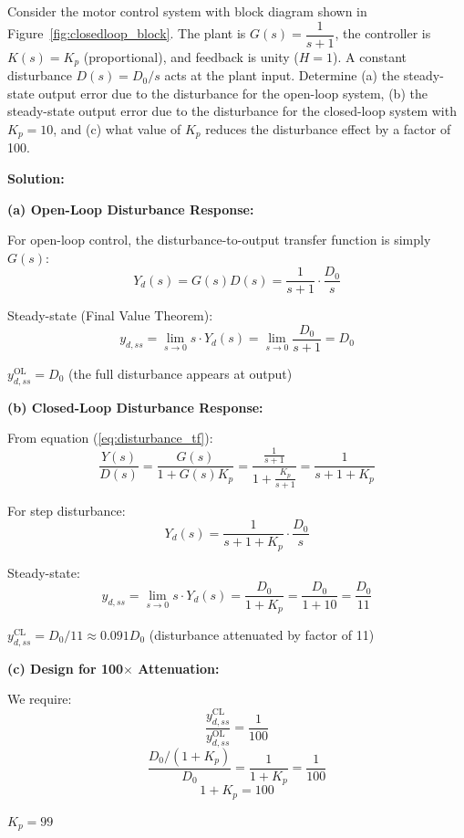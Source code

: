 \begin{example}
\label{ex:disturbance}
Consider the motor control system with block diagram shown in Figure~\ref{fig:closedloop_block}. The plant is $G(s) = \dfrac{1}{s+1}$, the controller is $K(s) = K_p$ (proportional), and feedback is unity ($H = 1$). A constant disturbance $D(s) = D_0/s$ acts at the plant input. Determine (a) the steady-state output error due to the disturbance for the open-loop system, (b) the steady-state output error due to the disturbance for the closed-loop system with $K_p = 10$, and (c) what value of $K_p$ reduces the disturbance effect by a factor of 100.

\textbf{Solution:}

\textbf{(a) Open-Loop Disturbance Response:}

For open-loop control, the disturbance-to-output transfer function is simply $G(s)$:
\begin{equation*}
Y_d(s) = G(s) D(s) = \frac{1}{s+1} \cdot \frac{D_0}{s}
\end{equation*}

Steady-state (Final Value Theorem):
\begin{equation*}
y_{d,ss} = \lim_{s \to 0} s \cdot Y_d(s) = \lim_{s \to 0} \frac{D_0}{s+1} = D_0
\end{equation*}

$\boxed{y_{d,ss}^{\text{OL}} = D_0}$ (the full disturbance appears at output)

\textbf{(b) Closed-Loop Disturbance Response:}

From equation (\ref{eq:disturbance_tf}):
\begin{equation*}
\frac{Y(s)}{D(s)} = \frac{G(s)}{1 + G(s)K_p} = \frac{\frac{1}{s+1}}{1 + \frac{K_p}{s+1}} = \frac{1}{s+1+K_p}
\end{equation*}

For step disturbance:
\begin{equation*}
Y_d(s) = \frac{1}{s+1+K_p} \cdot \frac{D_0}{s}
\end{equation*}

Steady-state:
\begin{equation*}
y_{d,ss} = \lim_{s \to 0} s \cdot Y_d(s) = \frac{D_0}{1+K_p} = \frac{D_0}{1+10} = \frac{D_0}{11}
\end{equation*}

$\boxed{y_{d,ss}^{\text{CL}} = D_0/11 \approx 0.091 D_0}$ (disturbance attenuated by factor of 11)

\textbf{(c) Design for 100$\times$ Attenuation:}

We require:
\begin{equation*}
\frac{y_{d,ss}^{\text{CL}}}{y_{d,ss}^{\text{OL}}} = \frac{1}{100}
\end{equation*}
\begin{equation*}
\frac{D_0/(1+K_p)}{D_0} = \frac{1}{1+K_p} = \frac{1}{100}
\end{equation*}
\begin{equation*}
1 + K_p = 100
\end{equation*}

$\boxed{K_p = 99}$
\end{example}

